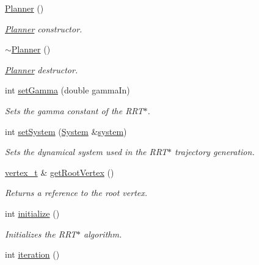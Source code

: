 \begin{DoxyCompactItemize}
\item 
\hyperlink{class_r_r_tstar_1_1_planner_ac2cc9de409bd8bbf855003d346d429dd}{Planner} ()
\begin{DoxyCompactList}\small\item\em \hyperlink{class_r_r_tstar_1_1_planner}{Planner} constructor. \end{DoxyCompactList}\item 
\hyperlink{class_r_r_tstar_1_1_planner_a1238d4bb3b89d77e535fe9865918bf6c}{$\sim$\-Planner} ()
\begin{DoxyCompactList}\small\item\em \hyperlink{class_r_r_tstar_1_1_planner}{Planner} destructor. \end{DoxyCompactList}\item 
int \hyperlink{class_r_r_tstar_1_1_planner_a435fe4f1a1350994cddcb37b8b1e98f2}{set\-Gamma} (double gamma\-In)
\begin{DoxyCompactList}\small\item\em Sets the gamma constant of the R\-R\-T$\ast$. \end{DoxyCompactList}\item 
int \hyperlink{class_r_r_tstar_1_1_planner_a60656b9ef22c76aa5e5c71f75a205cd4}{set\-System} (\hyperlink{class_system}{System} \&\hyperlink{class_r_r_tstar_1_1_planner_a5472cbb3b3f13ceb5987507b6db0558b}{system})
\begin{DoxyCompactList}\small\item\em Sets the dynamical system used in the R\-R\-T$\ast$ trajectory generation. \end{DoxyCompactList}\item 
\hyperlink{class_r_r_tstar_1_1_vertex}{vertex\-\_\-t} \& \hyperlink{class_r_r_tstar_1_1_planner_a61d83e1b14a5c10cd26994ede94090e4}{get\-Root\-Vertex} ()
\begin{DoxyCompactList}\small\item\em Returns a reference to the root vertex. \end{DoxyCompactList}\item 
int \hyperlink{class_r_r_tstar_1_1_planner_a05ab5b8d4ccd112b8588ad9f8bd0cff7}{initialize} ()
\begin{DoxyCompactList}\small\item\em Initializes the R\-R\-T$\ast$ algorithm. \end{DoxyCompactList}\item 
int \hyperlink{class_r_r_tstar_1_1_planner_a472cff906333b55bb39d879b56b05a9f}{iteration} ()

\end{DoxyCompactItemize}
